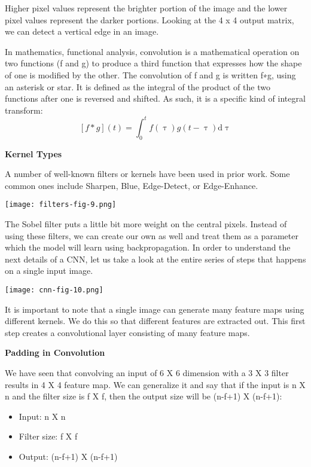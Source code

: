 Higher pixel values represent the brighter portion of the image and the lower pixel values represent the darker portions. Looking at the 4 x 4 output matrix, we can detect a vertical edge in an image.
\par
In mathematics, functional analysis,  convolution is a mathematical operation on two functions (f and g) to produce a third function that expresses how the shape of one is modified by the other. The convolution of f and g is written f∗g, using an asterisk or star. It is defined as the integral of the product of the two functions after one is reversed and shifted. As such, it is a specific kind of integral transform:
$$ [f*g](t) = \int_{0}^{t} f(\uptau) g(t - \uptau) \mathrm{d} \uptau $$


\begin{flushleft}
  \textbf{Kernel Types}
\end{flushleft}

A number of well-known filters or kernels have been used in prior work. Some common ones include Sharpen, Blue, Edge-Detect, or Edge-Enhance.

\texttt{[image: filters-fig-9.png]}

The Sobel filter puts a little bit more weight on the central pixels. Instead of using these filters, we can create our own as well and treat them as a parameter which the model will learn using backpropagation. In order to understand the next details of a CNN, let us take a look at the entire series of steps that happens on a single input image.
\par
\texttt{[image: cnn-fig-10.png]}

It is important to note that a single image can generate many feature maps using different kernels. We do this so that different features are extracted out. This first step creates a convolutional layer consisting of many feature maps.
\par
\begin{flushleft}
  \textbf{Padding in Convolution}
\end{flushleft}

We have seen that convolving an input of 6 X 6 dimension with a 3 X 3 filter results in 4 X 4 feature map. We can generalize it and say that if the input is n X n and the filter size is f X f, then the output size will be (n-f+1) X (n-f+1):
\par
\begin{itemize}
  \item Input: n X n
  \item Filter size: f X f
  \item Output: (n-f+1) X (n-f+1)
\end{itemize}

